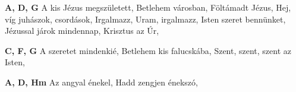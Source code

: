 \begin{multicols}{2}
\begin{minipage}{\textwidth}
\end{minipage}
\begin{minipage}{\textwidth}
\textbf{A, D, G}\newline
\textbullet\hspace{1 mm}A kis Jézus megszületett, \pageref{AkisJC3A9zusmegszC3BCletett}\newline
\textbullet\hspace{1 mm}Betlehem városban, \pageref{BetlehemvC3A1rosban}\newline
\textbullet\hspace{1 mm}Föltámadt Jézus, \pageref{FC3B6ltC3A1madtJC3A9zus}\newline
\textbullet\hspace{1 mm}Hej, víg juhászok, csordások, \pageref{Hej2CvC3ADgjuhC3A1szok2CcsordC3A1sok}\newline
\textbullet\hspace{1 mm}Irgalmazz, Uram, irgalmazz, \pageref{Irgalmazz2CUram2Cirgalmazz}\newline
\textbullet\hspace{1 mm}Isten szeret bennünket, \pageref{IstenszeretbennC3BCnket}\newline
\textbullet\hspace{1 mm}Jézussal járok mindennap, \pageref{JC3A9zussaljC3A1rokmindennap}\newline
\textbullet\hspace{1 mm}Krisztus az Úr, \pageref{KrisztusazC39Ar}\newline

\end{minipage}
\begin{minipage}{\textwidth}
\textbf{C, F, G}\newline
\textbullet\hspace{1 mm}A szeretet mindenkié, \pageref{AszeretetmindenkiC3A9}\newline
\textbullet\hspace{1 mm}Betlehem kis falucskába, \pageref{BetlehemkisfalucskC3A1ba}\newline
\textbullet\hspace{1 mm}Szent, szent, szent az Isten, \pageref{Szent2Cszent2CszentazIsten}\newline

\end{minipage}
\begin{minipage}{\textwidth}
\textbf{A, D, Hm}\newline
\textbullet\hspace{1 mm}Az angyal énekel, \pageref{AzangyalC3A9nekel}\newline
\textbullet\hspace{1 mm}Hadd zengjen énekszó, \pageref{HaddzengjenC3A9nekszC3B3}\newline


\end{minipage}
\end{multicols}

